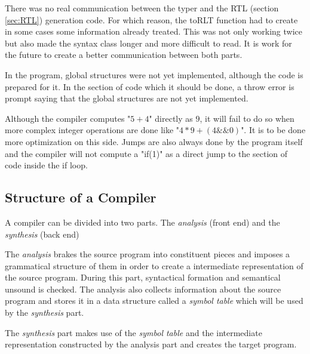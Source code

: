 \documentclass[conference]{IEEEtran}
\theoremstyle{definition}
\begin{document}
There was no real communication between the typer and the RTL (section \ref{sec:RTL}) generation code. For which reason, the toRLT function had to create in some cases some information already treated. This was not only working twice but also made the syntax class longer and more difficult to read. It is work for the future to create a better communication between both parts.

In the program, global structures were not yet implemented, although the code is prepared for it. In the section of code which it should be done, a throw error is prompt saying that the global structures are not yet implemented.

Although the compiler computes "$5 + 4$" directly as $9$, it will fail to do so when more complex integer operations are done like "$4 * 9 + (4 \&\& 0)$". It is to be done more optimization on this side. Jumps are also always done by the program itself and the compiler will not compute a "if(1)" as a direct jump to the section of code inside the if loop.



\subsection{Structure of a Compiler}\label{sub_structure_of_a_compiler}

A compiler can be divided into two parts. The \textit{analysis} (front end) and the \textit{synthesis} (back end)

The \textit{analysis} brakes the source program into constituent pieces and imposes a grammatical structure of them in order to create a intermediate representation of the source program. During this part, syntactical formation and semantical unsound is checked. The analysis also collects information about the source program and stores it in a data structure called a \textit{symbol table} which will be used by the \textit{synthesis} part.

The \textit{synthesis} part makes use of the \textit{symbol table} and the intermediate representation constructed by the analysis part and creates the target program.
\end{document}
